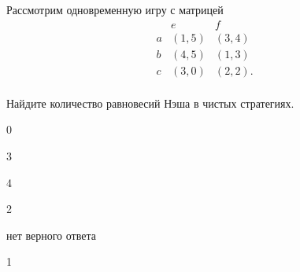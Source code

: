 
\begin{question}
Рассмотрим одновременную игру с матрицей \[
\begin{matrix}
   & e & f \\
a  & (1, 5) & (3, 4) \\
b  & (4, 5) & (1, 3) \\
c  & (3, 0)          & (2, 2). \\
\end{matrix}
\]

Найдите количество равновесий Нэша в чистых стратегиях.
\begin{answerlist}
  \item 0
  \item 3
  \item 4
  \item 2
  \item нет верного ответа
  \item 1
\end{answerlist}
\end{question}


